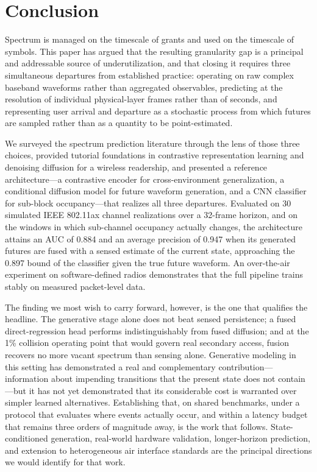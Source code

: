 \documentclass[lettersize,journal]{IEEEtran}
\begin{document}
\section{\textbf{Conclusion}}

Spectrum is managed on the timescale of grants and used on the timescale
of symbols. This paper has argued that the resulting granularity gap is a
principal and addressable source of underutilization, and that closing it
requires three simultaneous departures from established practice:
operating on raw complex baseband waveforms rather than aggregated
observables, predicting at the resolution of individual physical-layer
frames rather than of seconds, and representing user arrival and
departure as a stochastic process from which futures are sampled rather
than as a quantity to be point-estimated.

We surveyed the spectrum prediction literature through the lens of those
three choices, provided tutorial foundations in contrastive
representation learning and denoising diffusion for a wireless
readership, and presented a reference architecture---a contrastive
encoder for cross-environment generalization, a conditional diffusion model
for future waveform generation, and a CNN classifier for sub-block
occupancy---that realizes all three departures. Evaluated on 30 simulated
IEEE 802.11ax channel realizations over a 32-frame horizon, and on the windows
in which sub-channel occupancy actually changes, the architecture attains an AUC
of 0.884 and an average precision of 0.947 when its generated futures
are fused with a sensed estimate of the current state, approaching the
0.897 bound of the classifier given the true future waveform. An
over-the-air experiment on software-defined radios demonstrates that the
full pipeline trains stably on measured packet-level data.

The finding we most wish to carry forward, however, is the one that
qualifies the headline. The generative stage alone does not beat sensed
persistence; a fused direct-regression head performs
indistinguishably from fused diffusion; and at the 1\% collision
operating point that would govern real secondary access, fusion recovers
no more vacant spectrum than sensing alone. Generative modeling in this
setting has demonstrated a real and complementary contribution---
information about impending transitions that the present state does not
contain---but it has not yet demonstrated that its considerable cost is
warranted over simpler learned alternatives. Establishing that, on
shared benchmarks, under a protocol that evaluates where events actually
occur, and within a latency budget that remains three orders of
magnitude away, is the work that follows. State-conditioned generation,
real-world hardware validation, longer-horizon prediction, and extension to
heterogeneous air interface standards are the principal directions we would
identify for that work.
\end{document}
